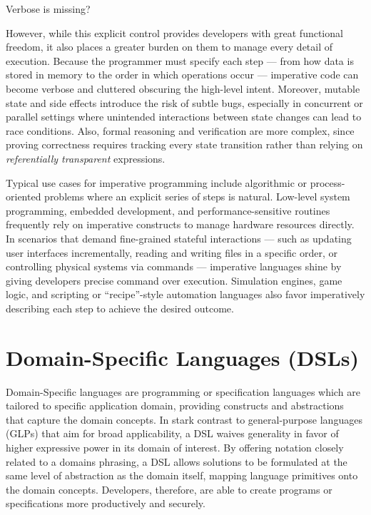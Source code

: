 \documentclass[11pt]{report}
\begin{document}
Verbose is missing?

However, while this explicit control provides developers with great functional freedom, it also places a greater burden on them to manage every detail of execution.
Because the programmer must specify each step — from how data is stored in memory to the order in which operations occur — imperative code can become verbose and cluttered obscuring the high-level intent.
Moreover, mutable state and side effects introduce the risk of subtle bugs, especially in concurrent or parallel settings where unintended interactions between state changes
can lead to race conditions. Also, formal reasoning and verification are more complex, since proving correctness requires tracking every state 
transition rather than relying on \textit{referentially transparent} expressions.

Typical use cases for imperative programming include algorithmic or process-oriented problems where an explicit series of steps is natural.
Low-level system programming, embedded development, and performance-sensitive routines frequently rely on imperative constructs to manage hardware resources directly.
In scenarios that demand fine-grained stateful interactions — such as updating user interfaces incrementally, reading and writing files in a specific order, or
controlling physical systems via commands — imperative languages shine by giving developers precise command over execution.
Simulation engines, game logic, and scripting or “recipe”-style automation languages also favor imperatively describing each step to achieve the desired outcome.

\section{Domain-Specific Languages (DSLs)}

Domain-Specific languages are programming or specification languages which are tailored to specific application domain, providing constructs and abstractions
that capture the domain concepts. \cite{whenHowDSL} In stark contrast to general-purpose languages (GLPs) that aim for broad applicability, a DSL waives generality in favor
of higher expressive power in its domain of interest. By offering notation closely related to a domains phrasing, a DSL allows solutions to be formulated at the same level
of abstraction as the domain itself, mapping language primitives onto the domain concepts. Developers, therefore, are able to create programs or specifications more
productively and securely.
\end{document}
